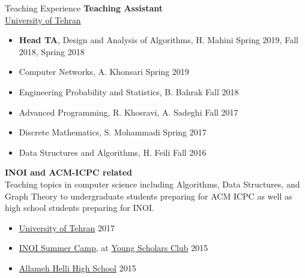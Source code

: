 \documentclass{resume} %
\begin{document}

\begin{rSection}{Teaching Experience}
	{\bf Teaching Assistant}
	\\\href{http://ut.ac.ir/en}{University of Tehran}
	\begin{itemize}
		\item {\bf Head TA}, Design and Analysis of Algorithms, H. Mahini \hfill Spring 2019, Fall 2018, Spring 2018
		\item Computer Networks, A. Khonsari \hfill Spring 2019
		\item Engineering Probability and Statistics, B. Bahrak \hfill Fall 2018
		\item Advanced Programming, R. Khosravi, A. Sadeghi \hfill Fall 2017
		\item Discrete Mathematics, S. Mohammadi \hfill Spring 2017
		\item Data Structures and Algorithms, H. Feili \hfill Fall 2016
	\end{itemize}
	
	{\bf INOI and ACM-ICPC related}
	\\Teaching topics in computer science including Algorithms, Data Structures,
	and Graph Theory to undergraduate students preparing for ACM ICPC as well as high school
	students preparing for INOI.
	\begin{itemize}
		\item \href{http://ut.ac.ir/en}{University of Tehran} \hfill 2017
		\item \href{http://inoi.ir/}{INOI Summer Camp}, at \href{http://ysc.ac.ir/}{Young Scholars Club} \hfill 2015
		\item \href{http://www.helli.ir/}{Allameh Helli High School} \hfill 2015
	\end{itemize}
\end{rSection}
\end{document}
